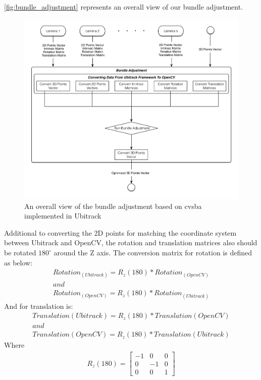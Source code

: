 \autoref{fig:bundle_adjustment} represents an overall view of our bundle adjustment.
 \begin{figure}[H]
  \centering
  \includegraphics[width=\textwidth]{figures/bundle_adjustment}
  \caption{An overall view of the bundle adjustment based on cvsba implemented in Ubitrack}\label{fig:bundle_adjustment}
  \end{figure}

Additional to converting the 2D points for matching the coordinate system between Ubitrack and OpenCV, the rotation and translation matrices also should be rotated $180 ^{\circ}$ around the Z axis. The conversion matrix for rotation is defined as below:
\begin{gather*}
	Rotation_{(Ubitrack)} = R_{z}(180) * Rotation_{(OpenCV)}\\
	and\\
    Rotation_{(OpenCV)} = R_{z}(180) * Rotation_{(Ubitrack)}
\end{gather*}
And for translation is:
\begin{gather*}
	Translation{(Ubitrack)} = R_{z}(180) * Translation{(OpenCV)}\\
	and\\
    Translation{(OpenCV)} = R_{z}(180) * Translation{(Ubitrack)}
\end{gather*}
Where 
\begin{gather*}
	R_{z}(180) = \begin{bmatrix}
       -1 & 0 & 0   \\[0.3em]
       0 & -1 & 0   \\[0.3em]
       0  & 0 & 1
     \end{bmatrix}
\end{gather*}

